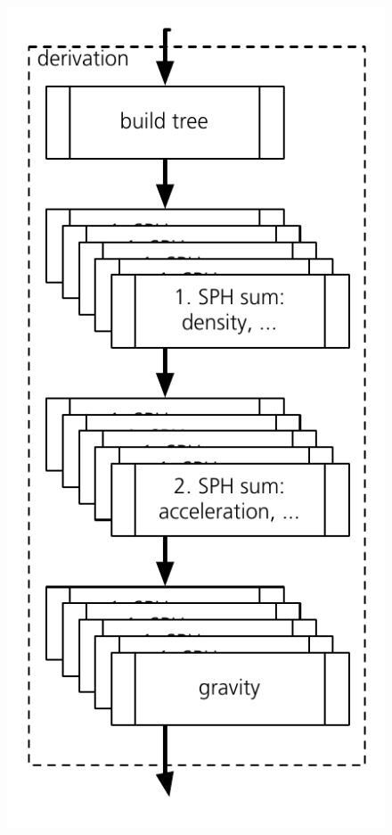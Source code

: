 \begin{figure}[htbp]
\begin{center}
\includegraphics[scale=0.6]{22algo_sphlatch02.pdf}
\caption{}
\label{ch02_fig22}
\end{center}
\end{figure}

